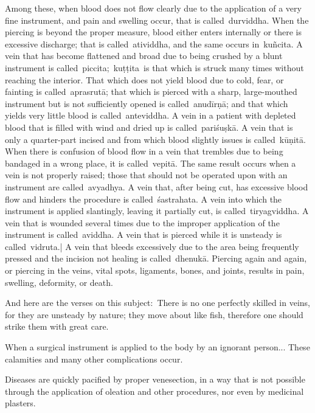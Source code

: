 \begin{translation}
\begin{tt}
\item[19]
Among these, when blood does not flow clearly due to the application of a very fine instrument, and pain and swelling occur, that is called durviddha.
When the piercing is beyond the proper measure, blood either enters internally or there is excessive discharge; that is called atividdha, and the same occurs in kuñcita.
A vein that has become flattened and broad due to being crushed by a blunt instrument is called piccita; kuṭṭita is that which is struck many times without reaching the interior.
That which does not yield blood due to cold, fear, or fainting is called aprasrutā; that which is pierced with a sharp, large-mouthed instrument but is not sufficiently opened is called anudīrṇā; and that which yields very little blood is called anteviddha.
A vein in a patient with depleted blood that is filled with wind and dried up is called pariśuṣkā.
A vein that is only a quarter-part incised and from which blood slightly issues is called kūṇitā.
When there is confusion of blood flow in a vein that trembles due to being bandaged in a wrong place, it is called vepitā.
The same result occurs when a vein is not properly raised; those that should not be operated upon with an instrument are called avyadhya.
A vein that, after being cut, has excessive blood flow and hinders the procedure is called śastrahata.
A vein into which the instrument is applied slantingly, leaving it partially cut, is called tiryagviddha.
A vein that is wounded several times due to the improper application of the instrument is called aviddha.
A vein that is pierced while it is unsteady is called vidruta.|
A vein that bleeds excessively due to the area being frequently pressed and the incision not healing is called dhenukā.
Piercing again and again, or piercing in the veins, vital spots, ligaments, bones, and joints, results in pain, swelling, deformity, or death.



\item[20]
And here are the verses on this subject: There is no one perfectly skilled in veins, for they are unsteady by nature; they move about like fish, therefore one should strike them with great care.

\item[21]
When a surgical instrument is applied to the body by an ignorant person...
These calamities and many other complications occur.

\item[22]
Diseases are quickly pacified by proper venesection, in a way that is not possible through the application of oleation and other procedures, nor even by medicinal plasters.


\end{tt}
\end{translation}
